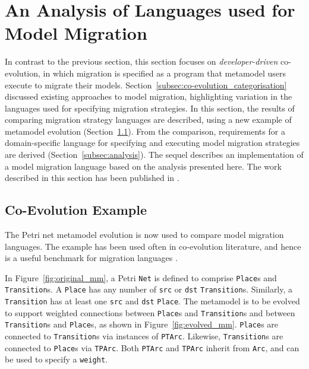
\section[An Analysis of Languages used for Model Migration][An Analysis of Model Migration Languages]{An Analysis of Languages used for Model Migration}
\label{sec:analyis_of_languages_used_for_migration}
In contrast to the previous section, this section focuses on \emph{developer-driven} co-evolution, in which migration is specified as a program that metamodel users execute to migrate their models. Section~\ref{subsec:co-evolution_categorisation} discussed existing approaches to model migration, highlighting variation in the languages used for specifying migration strategies. In this section, the results of comparing migration strategy languages are described, using a new example of metamodel evolution (Section~\ref{subsec:co-evo_example}). From the comparison, requirements for a domain-specific language for specifying and executing model migration strategies are derived (Section~\ref{subsec:analysis}). The sequel describes an implementation of a model migration language based on the analysis presented here. The work described in this section has been published in \cite{rose10flock}.

\subsection{Co-Evolution Example}
\label{subsec:co-evo_example}
The Petri net metamodel evolution is now used to compare model migration languages. The example has been used often in co-evolution literature, and hence is a useful benchmark for migration languages \cite{cicchetti08automating,garces09managing,wachsmuth07metamodel}.

In Figure~\ref{fig:original_mm}, a Petri \texttt{Net} is defined to comprise \texttt{Pl\-a\-ce}s and \texttt{Tr\-an\-si\-ti\-on}s. A \texttt{Pl\-a\-ce} has any number of \texttt{src} or \texttt{dst} \texttt{Tr\-an\-si\-ti\-on}s. Similarly, a \texttt{Tr\-an\-si\-ti\-on} has at least one \texttt{src} and \texttt{dst} \texttt{Pl\-a\-ce}. The metamodel is to be evolved to support weighted connections between \texttt{Pl\-a\-ce}s and \texttt{Tr\-an\-si\-ti\-on}s and between \texttt{Tr\-an\-si\-ti\-on}s and \texttt{Pl\-a\-ce}s, as shown in Figure~\ref{fig:evolved_mm}. \texttt{Pl\-a\-ce}s are connected to \texttt{Tr\-an\-si\-ti\-on}s via instances of \texttt{PTArc}. Likewise, \texttt{Tr\-an\-si\-ti\-on}s are connected to \texttt{Pl\-a\-ce}s via \texttt{TPArc}. Both \texttt{PTArc} and \texttt{TPArc} inherit from \texttt{Arc}, and can be used to specify a \texttt{we\-ig\-ht}.

